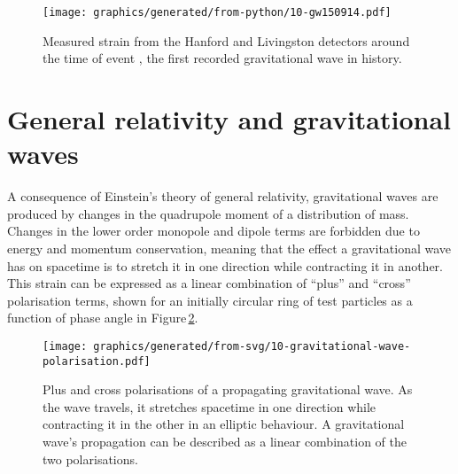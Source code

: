 \begin{figure}
  \centering
  \texttt{[image: graphics/generated/from-python/10-gw150914.pdf]}
  \caption[Measured strain from the LIGO Hanford and Livingston detectors around the time of event \GWFIRSTEVENT{}]{\label{fig:gw150914}Measured strain from the \LIGO{} Hanford and Livingston detectors around the time of event \GWFIRSTEVENT{}, the first recorded gravitational wave in history.}
\end{figure}

\section{General relativity and gravitational waves}
A consequence of Einstein's theory of general relativity, gravitational waves are produced by changes in the quadrupole moment of a distribution of mass. Changes in the lower order monopole and dipole terms are forbidden due to energy and momentum conservation, meaning that the effect a gravitational wave has on spacetime is to stretch it in one direction while contracting it in another. This strain can be expressed as a linear combination of ``plus'' and ``cross'' polarisation terms, shown for an initially circular ring of test particles as a function of phase angle in Figure\,\ref{fig:gravitational-wave-polarisation}.

\begin{figure}
  \centering
  \texttt{[image: graphics/generated/from-svg/10-gravitational-wave-polarisation.pdf]}
  \caption[Plus and cross polarisations of a propagating gravitational wave]{\label{fig:gravitational-wave-polarisation}Plus and cross polarisations of a propagating gravitational wave. As the wave travels, it stretches spacetime in one direction while contracting it in the other in an elliptic behaviour. A gravitational wave's propagation can be described as a linear combination of the two polarisations.}
\end{figure}

